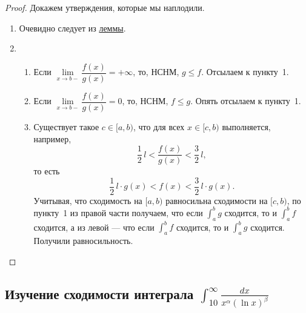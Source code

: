 \begin{proof}
	Докажем утверждения, которые мы наплодили.
	\begin{enumerate}
		\item Очевидно следует из \hyperlink{srshlem}{леммы}.
		\item
		\begin{enumerate}
			\item Если \(\lim\limits_{x \to b-} \dfrac{f(x)}{g(x)} = +\infty\), то, НСНМ, \(g \leqslant f\). Отсылаем к пункту~1.
			\item Если \(\lim\limits_{x \to b-} \dfrac{f(x)}{g(x)} = 0\), то, НСНМ, \(f \leqslant g\). Опять отсылаем к пункту~1.
			\item Существует такое \(c \in [a, b)\), что для всех \(x \in [c, b)\) выполняется, 	например, \[
				\frac{1}{2} \, l < \frac{f(x)}{g(x)} < \frac{3}{2} \, l,
			\]
			то есть \[
				\frac{1}{2} \, l  \cdot g(x) < f(x) < \frac{3}{2} \, l \cdot g(x).
			\]
			Учитывая, что сходимость на \([a, b)\) равносильна сходимости на \([c, b)\), по пункту~1 из правой части получаем, что если \(\int_a^b g\) сходится, то и \(\int_a^b f\) сходится, а из левой --- что если \(\int_a^b f\) сходится, то и \(\int_a^b g\) сходится. Получили равносильность.
		\end{enumerate}
	\end{enumerate}
\end{proof}

\subsection{Изучение сходимости интеграла $\int_{10}^\infty \frac{dx}{x^\alpha (\ln x)^\beta}$}

